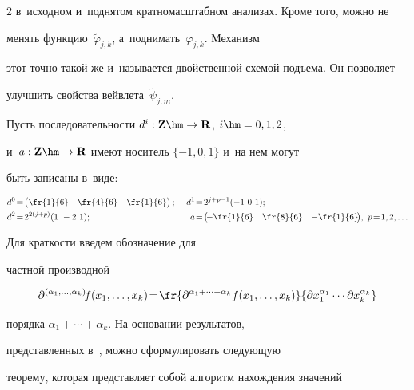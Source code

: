 \begin{multicols}{2}
в~исходном и~поднятом крат\-но\-мас\-штаб\-ном анализах. Кроме того, можно не 


менять функцию~$\tilde{\varphi}_{j,k}$, а~поднимать~$\varphi_{j,k}$. Механизм 


этот точ\-но такой же и~называется двойственной схемой подъема. Он позволяет 


улучшить свойства вейв\-ле\-та~$\tilde{\psi}_{j,m}$.


  


  Пусть последовательности $d^i: \mathbf{Z}\hm\to \mathbf{R}$, $i\hm= 0,1,2$, 


и~$a: \mathbf{Z}\hm\to \mathbf{R}$ имеют носитель $\{-1, 0, 1\}$ и~на нем могут 


быть записаны в~виде:


\begin{alignat*}{2}


d^0&\!=\!\begin{pmatrix}


\fr{1}{6} & \fr{4}{6} & \fr{1}{6}\end{pmatrix};&\ 


d^1&\!=\! 2^{j+p-1}(-1\ 0\ 1); \\


d^2&\!=\!


2^{2(j+p)}(1\ -2\ 1);&\ 


a&\!=\! \begin{pmatrix}\!


-\fr{1}{6} & \fr{8}{6} & -\fr{1}{6}\!\end{pmatrix}\!,\ p\!=\!1,2,\ldots


\end{alignat*}


 Для краткости введем обозначение для 


част\-ной производной


  $$


  \partial^{(\alpha_1, \ldots, \alpha_k)} \! f(x_1, \ldots, x_k)\!=\! 


  \fr{\partial^{\alpha_1+\cdots+\alpha_k} f(x_1,\ldots , x_k)}{\partial 


x_1^{\alpha_1}\cdots \partial x_k^{\alpha_k}}


  $$


  порядка $\alpha_1+\cdots + \alpha_k$. На основании результатов, 


пред\-став\-лен\-ных в~\cite{7-bos, 9-bos}, можно сформулировать сле\-ду\-ющую 


тео\-ре\-му, которая пред\-став\-ля\-ет собой алгоритм на\-хож\-де\-ния значений 



\end{multicols}
